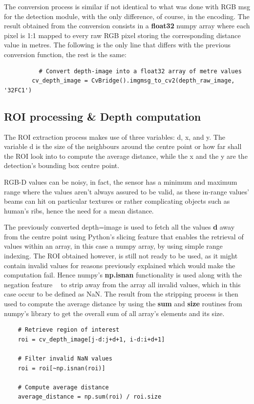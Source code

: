 The conversion process is similar if not identical to what was done with RGB msg for the detection module, with the only difference, of course, in the encoding. The result obtained from the conversion consists in a \textbf{float32} numpy array where each pixel is 1:1 mapped to every raw RGB pixel storing the corresponding distance value in metres. The following is the only line that differs with the previous conversion function, the rest is the same:

\begin{lstlisting}
    	  # Convert depth-image into a float32 array of metre values
        cv_depth_image = CvBridge().imgmsg_to_cv2(depth_raw_image, '32FC1')
\end{lstlisting}

\subsection{ROI processing \& Depth computation}

The ROI extraction process makes use of three variables: d, x, and y. The variable d is the size of the neighbours around the centre point or how far shall the ROI look into to compute the average distance, while the x and the y are the detection's bounding box centre point.

RGB-D values can be noisy, in fact, the sensor has a minimum and maximum range where the values aren't always assured to be valid, as these in-range values' beams can hit on particular textures or rather complicating objects such as human's ribs, hence the need for a mean distance.

The previously converted depth=image is used to fetch all the values \textbf{d} away from the centre point using Python's slicing feature that enables the retrieval of values within an array, in this case a numpy array, by using simple range indexing. The ROI obtained however, is still not ready to be used, as it might contain invalid values for reasons previously explained which would make the computation fail. Hence numpy's \textbf{np.isnan} functionality is used along with the negation feature \textbf{~} to strip away from the array all invalid values, which in this case occur to be defined as NaN. The result from the stripping process is then used to compute the average distance by using the \textbf{sum} and \textbf{size} routines from numpy's library to get the overall sum of all array's elements and its size.

\begin{lstlisting}
    # Retrieve region of interest
    roi = cv_depth_image[j-d:j+d+1, i-d:i+d+1]
    
    # Filter invalid NaN values
    roi = roi[~np.isnan(roi)]
    
    # Compute average distance
    average_distance = np.sum(roi) / roi.size
\end{lstlisting}

